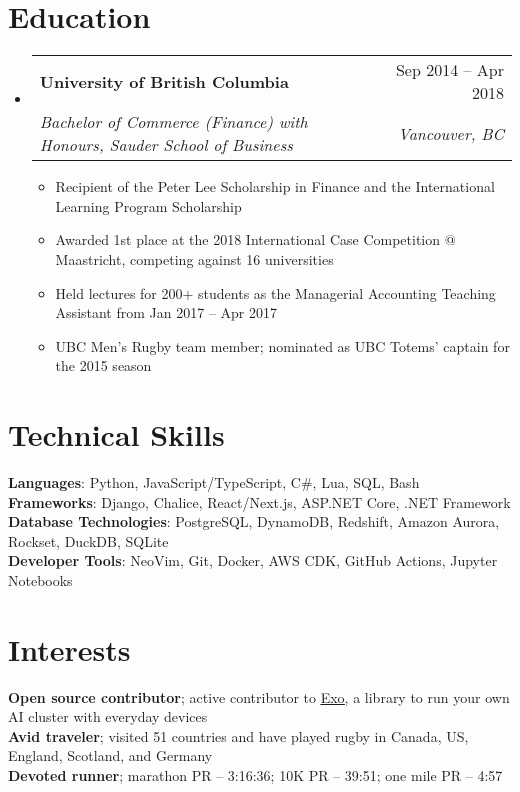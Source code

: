 \documentclass[letterpaper,11pt]{article}
\makeatletter
\newcommand{\resumeItem}[1]{
  \item\small{
    {#1 \vspace{-2pt}}
  }
}
\newcommand{\resumeSubheading}[4]{
  \vspace{-2pt}\item
    \begin{tabular*}{0.97\textwidth}[t]{l@{\extracolsep{\fill}}r}
      \textbf{#1} & #2 \\
      \textit{\small#3} & \textit{\small #4} \\
    \end{tabular*}\vspace{-7pt}
}
\newcommand{\resumeSubHeadingListStart}{\begin{itemize}[leftmargin=0.15in, label={}]}
\newcommand{\resumeSubHeadingListEnd}{\end{itemize}}
\newcommand{\resumeItemListStart}{\begin{itemize}}
\newcommand{\resumeItemListEnd}{\end{itemize}\vspace{-5pt}}
\makeatother
\begin{document}
\section{Education}
  \resumeSubHeadingListStart
    \resumeSubheading
      {University of British Columbia}{Sep 2014 -- Apr 2018}
      {Bachelor of Commerce (Finance) with Honours, Sauder School of Business}{Vancouver, BC}
      \resumeItemListStart
        \resumeItem{Recipient of the Peter Lee Scholarship in Finance and the International Learning Program Scholarship}
        \resumeItem{Awarded 1st place at the 2018 International Case Competition @ Maastricht, competing against 16 universities}
        \resumeItem{Held lectures for 200+ students as the Managerial Accounting Teaching Assistant from Jan 2017 -- Apr 2017}
        \resumeItem{UBC Men's Rugby team member; nominated as UBC Totems' captain for the 2015 season}
      \resumeItemListEnd
  \resumeSubHeadingListEnd

\section{Technical Skills}
 \begin{itemize}[leftmargin=0.15in, label={}]
    \small{\item{
     \textbf{Languages}{: Python, JavaScript/TypeScript, C\#, Lua, SQL, Bash}\\
     \textbf{Frameworks}{: Django, Chalice, React/Next.js, ASP.NET Core, .NET Framework}\\
     \textbf{Database Technologies}{: PostgreSQL, DynamoDB, Redshift, Amazon Aurora, Rockset, DuckDB, SQLite}\\
     \textbf{Developer Tools}{: NeoVim, Git, Docker, AWS CDK, GitHub Actions, Jupyter Notebooks}
    }}
 \end{itemize}

\section{Interests}
 \begin{itemize}[leftmargin=0.15in, label={}]
    \small{\item{
      \textbf{Open source contributor}{; active contributor to }\href{https://github.com/exo-explore/exo}{\underline{Exo}}{, a library to run your own AI cluster with everyday devices}\\
     \textbf{Avid traveler}{; visited 51 countries and have played rugby in Canada, US, England, Scotland, and Germany}\\
     \textbf{Devoted runner}{; marathon PR – 3:16:36; 10K PR – 39:51; one mile PR – 4:57}
    }}
 \end{itemize}
\end{document}

